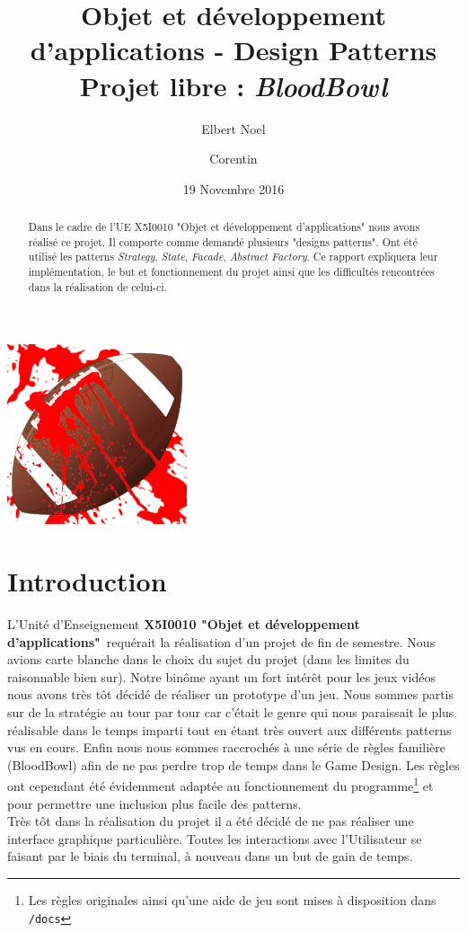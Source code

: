 \documentclass{article}
\title{Objet et développement d'applications - Design Patterns\\
Projet libre : \emph{BloodBowl}}
\author{Elbert Noel \bsc{Nyunting} \and Corentin \bsc{Chédotal}}
\date{19 Novembre 2016}
\newcommand{\info}{\texttt}
\newcommand{\pattern}{\emph}
\newcommand{\ue}{\textbf{X5I0010 "Objet et développement d'applications"}}
\begin{document}
\begin{titlepage}

\maketitle
\thispagestyle{empty}

\vspace{2cm}
\centerline{\includegraphics[scale=0.75]{img/logo.png}}
\vspace{2cm}

\begin{abstract}
    Dans le cadre de l'UE X5I0010 "Objet et développement d'applications" nous avons réalisé ce projet. Il comporte comme demandé plusieurs "designs patterns". Ont été utilisé les patterns \pattern{Strategy}, \pattern{State}, \pattern{Facade}, \pattern{Abstract Factory}. Ce rapport expliquera leur implémentation, le but et fonctionnement du projet ainsi que les difficultés rencontrées dans la réalisation de celui-ci.
\end{abstract}
\end{titlepage}

\newpage

\tableofcontents
\thispagestyle{empty}
\clearpage

\newpage

\section{Introduction}
    
    L'Unité d'Enseignement \ue\ requérait la réalisation d'un projet de fin de semestre. Nous avions carte blanche dans le choix du sujet du projet (dans les limites du raisonnable bien sur). Notre binôme ayant un fort intérêt pour les jeux vidéos nous avons très tôt décidé de réaliser un prototype d'un jeu. Nous sommes partis sur de la stratégie au tour par tour car c'était le genre qui nous paraissait le plus réalisable dans le temps imparti tout en étant très ouvert aux différents patterns vus en cours. Enfin nous nous sommes raccrochés à une série de règles familière (BloodBowl) afin de ne pas perdre trop de temps dans le Game Design. Les règles ont cependant été évidemment adaptée au fonctionnement du programme\footnote{Les règles originales ainsi qu'une aide de jeu sont mises à disposition dans \info{/docs}} et pour permettre une inclusion plus facile des patterns.\\
    Très tôt dans la réalisation du projet il a été décidé de ne pas réaliser une interface graphique particulière. Toutes les interactions avec l'Utilisateur se faisant par le biais du terminal, à nouveau dans un but de gain de temps.
\end{document}

